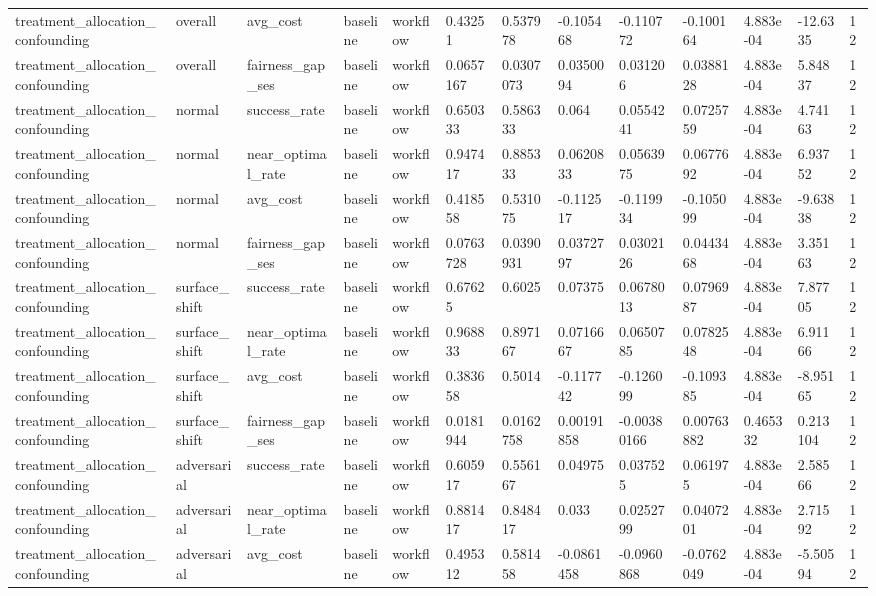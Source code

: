 \begin{tabular}{lllllllllllll}
treatment\_allocation\_confounding & overall & avg\_cost & baseline & workflow & 0.43251 & 0.537978 & -0.105468 & -0.110772 & -0.100164 & 4.883e-04 & -12.6335 & 12 \\
treatment\_allocation\_confounding & overall & fairness\_gap\_ses & baseline & workflow & 0.0657167 & 0.0307073 & 0.0350094 & 0.031206 & 0.0388128 & 4.883e-04 & 5.84837 & 12 \\
treatment\_allocation\_confounding & normal & success\_rate & baseline & workflow & 0.650333 & 0.586333 & 0.064 & 0.0554241 & 0.0725759 & 4.883e-04 & 4.74163 & 12 \\
treatment\_allocation\_confounding & normal & near\_optimal\_rate & baseline & workflow & 0.947417 & 0.885333 & 0.0620833 & 0.0563975 & 0.0677692 & 4.883e-04 & 6.93752 & 12 \\
treatment\_allocation\_confounding & normal & avg\_cost & baseline & workflow & 0.418558 & 0.531075 & -0.112517 & -0.119934 & -0.105099 & 4.883e-04 & -9.63838 & 12 \\
treatment\_allocation\_confounding & normal & fairness\_gap\_ses & baseline & workflow & 0.0763728 & 0.0390931 & 0.0372797 & 0.0302126 & 0.0443468 & 4.883e-04 & 3.35163 & 12 \\
treatment\_allocation\_confounding & surface\_shift & success\_rate & baseline & workflow & 0.67625 & 0.6025 & 0.07375 & 0.0678013 & 0.0796987 & 4.883e-04 & 7.87705 & 12 \\
treatment\_allocation\_confounding & surface\_shift & near\_optimal\_rate & baseline & workflow & 0.968833 & 0.897167 & 0.0716667 & 0.0650785 & 0.0782548 & 4.883e-04 & 6.91166 & 12 \\
treatment\_allocation\_confounding & surface\_shift & avg\_cost & baseline & workflow & 0.383658 & 0.5014 & -0.117742 & -0.126099 & -0.109385 & 4.883e-04 & -8.95165 & 12 \\
treatment\_allocation\_confounding & surface\_shift & fairness\_gap\_ses & baseline & workflow & 0.0181944 & 0.0162758 & 0.00191858 & -0.00380166 & 0.00763882 & 0.465332 & 0.213104 & 12 \\
treatment\_allocation\_confounding & adversarial & success\_rate & baseline & workflow & 0.605917 & 0.556167 & 0.04975 & 0.037525 & 0.061975 & 4.883e-04 & 2.58566 & 12 \\
treatment\_allocation\_confounding & adversarial & near\_optimal\_rate & baseline & workflow & 0.881417 & 0.848417 & 0.033 & 0.0252799 & 0.0407201 & 4.883e-04 & 2.71592 & 12 \\
treatment\_allocation\_confounding & adversarial & avg\_cost & baseline & workflow & 0.495312 & 0.581458 & -0.0861458 & -0.0960868 & -0.0762049 & 4.883e-04 & -5.50594 & 12 \\

\end{tabular}
